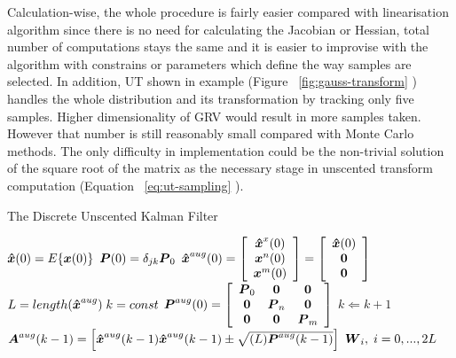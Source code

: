 Calculation-wise, the whole procedure is fairly easier compared with linearisation algorithm since there is no need for calculating the Jacobian or Hessian, total number of computations stays the same and it is easier to improvise with the algorithm with constrains or parameters which define the way samples are selected. In addition, UT shown in example (Figure ~\ref{fig:gauss-transform} ) handles the whole distribution and its transformation by tracking only five samples. Higher dimensionality of GRV would result in more samples taken. However that number is still reasonably small compared with Monte Carlo methods. The only difficulty in implementation could be the non-trivial solution of the square root of the matrix as the necessary stage in unscented transform computation (Equation ~\ref{eq:ut-sampling} ).
\begin{algorithm}%
\caption{The Discrete Unscented Kalman Filter} \label{alg:ukf}
\begin{algorithmic}
\REQUIRE $\boldsymbol{\hat{x}}(0) = E\lbrace \boldsymbol{x}(0) \rbrace$
\REQUIRE $\boldsymbol{P}(0) = \delta_{jk} \boldsymbol{P}_{0} $ 
\REQUIRE $\boldsymbol{\hat{x}}^{aug}(0) = \left[ \begin{array}{c} \boldsymbol{\hat{x}}^{x}(0) \\ \boldsymbol{x}^{n}(0) \\ \boldsymbol{x}^{m}(0) \end{array} \right]
                                  = \left[ \begin{array}{c} \boldsymbol{\hat{x}}(0) \\ \boldsymbol{0} \\ \boldsymbol{0} \end{array} \right] $ 
\STATE   $L = length(\boldsymbol{\hat{x}}^{aug}) \; k = const$
\REQUIRE $\boldsymbol{P}^{aug}(0) = \left[ \begin{array}{ccc} \boldsymbol{P}_{0} & \boldsymbol{0}     & \boldsymbol{0} \\ 
															\boldsymbol{0} & \boldsymbol{P}_{n} & \boldsymbol{0} \\
															\boldsymbol{0} & \boldsymbol{0}     & \boldsymbol{P}_{m} \end{array} \right] $ 
\LOOP
	\STATE $k \Leftarrow k+1$
	\STATE $\boldsymbol{A}^{aug}(k-1) = \left[\boldsymbol{\hat{x}}^{aug}(k-1) \boldsymbol{\hat{x}}^{aug}(k-1)\pm \sqrt{(L)\boldsymbol{P}^{aug}(k-1)}  \right] $
	\STATE   $ \boldsymbol{W}_{i}, \; i = 0,...,2L $

\end{algorithmic}
\end{algorithm}
